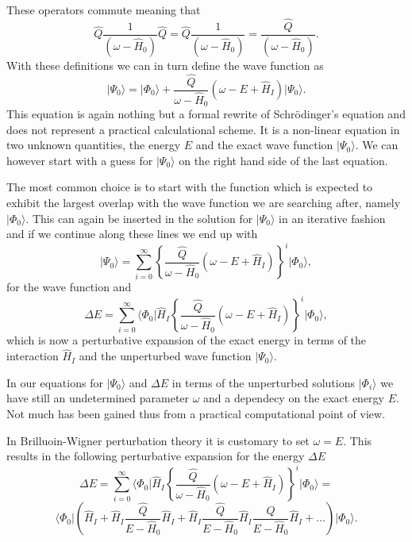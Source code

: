 These operators commute meaning that
\[
\hat{Q}\frac{1}{\left(\omega-\hat{H}_0\right)}\hat{Q}=\hat{Q}\frac{1}{\left(\omega-\hat{H}_0\right)}=\frac{\hat{Q}}{\left(\omega-\hat{H}_0\right)}.
\]
With these definitions we can in turn define the wave function as 
\[
\vert \Psi_0\rangle=\vert \Phi_0\rangle+\frac{\hat{Q}}{\omega-\hat{H}_0}\left(\omega-E+\hat{H}_I\right)\vert \Psi_0\rangle.
\]
This equation is again nothing but a formal rewrite of Schr\"odinger's equation
and does not represent a practical calculational scheme.  
It is a non-linear equation in two unknown quantities, the energy $E$ and the exact
wave function $\vert \Psi_0\rangle$. We can however start with a guess for $\vert \Psi_0\rangle$ on the right hand side of the last equation.



 The most common choice is to start with the function which is expected to exhibit the largest overlap with the wave function we are searching after, namely $\vert \Phi_0\rangle$. This can again be inserted in the solution for $\vert \Psi_0\rangle$ in an iterative fashion and if we continue along these lines we end up with
\[
\vert \Psi_0\rangle=\sum_{i=0}^{\infty}\left\{\frac{\hat{Q}}{\omega-\hat{H}_0}\left(\omega-E+\hat{H}_I\right)\right\}^i\vert \Phi_0\rangle, 
\]
for the wave function and
\[
\Delta E=\sum_{i=0}^{\infty}\langle \Phi_0\vert \hat{H}_I\left\{\frac{\hat{Q}}{\omega-\hat{H}_0}\left(\omega-E+\hat{H}_I\right)\right\}^i\vert \Phi_0\rangle, 
\]
which is now  a perturbative expansion of the exact energy in terms of the interaction
$\hat{H}_I$ and the unperturbed wave function $\vert \Psi_0\rangle$.



In our equations for $\vert \Psi_0\rangle$ and $\Delta E$ in terms of the unperturbed
solutions $\vert \Phi_i\rangle$  we have still an undetermined parameter $\omega$
and a dependecy on the exact energy $E$. Not much has been gained thus from a practical computational point of view. 

In Brilluoin-Wigner perturbation theory it is customary to set $\omega=E$. This results in the following perturbative expansion for the energy $\Delta E$
\[
\Delta E=\sum_{i=0}^{\infty}\langle \Phi_0\vert \hat{H}_I\left\{\frac{\hat{Q}}{\omega-\hat{H}_0}\left(\omega-E+\hat{H}_I\right)\right\}^i\vert \Phi_0\rangle=
\]
\[
\langle \Phi_0\vert \left(\hat{H}_I+\hat{H}_I\frac{\hat{Q}}{E-\hat{H}_0}\hat{H}_I+
\hat{H}_I\frac{\hat{Q}}{E-\hat{H}_0}\hat{H}_I\frac{\hat{Q}}{E-\hat{H}_0}\hat{H}_I+\dots\right)\vert \Phi_0\rangle. 
\]

